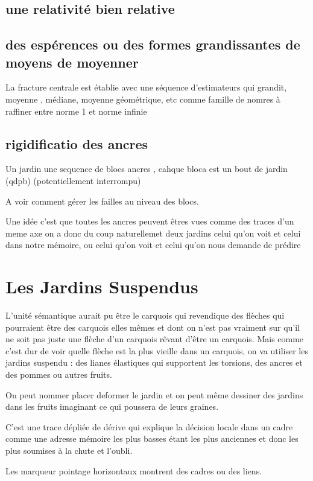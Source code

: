 \documentclass{article}
\begin{document}
\subsection{ une relativité bien relative}

\subsection{des espérences ou des formes grandissantes de moyens de  moyenner}
La fracture centrale  est établie avec une séquence d'estimateurs qui grandit, moyenne , médiane, moyenne géométrique, etc comme famille de nomres à raffiner  entre norme 1 et norme infinie
\subsection{rigidificatio des ancres}
Un jardin une sequence de blocs  ancres  , cahque bloca est un bout de jardin (qdpb) (potentiellement interrompu)

A voir comment gérer les failles au niveau des blocs.

Une idée c'est que toutes les ancres peuvent êtres vues comme des traces d'un meme axe on a donc du coup naturellemet deux jardins
celui qu'on voit et celui dans notre mémoire, ou celui qu'on voit et celui qu'on nous demande de prédire

  \section{Les Jardins Suspendus}
 
 L'unité sémantique  aurait pu être le carquois qui revendique des flèches qui pourraient être des carquois elles mêmes et dont 
on n'est pas vraiment sur qu'il ne soit pas juste  une flèche d'un carquois rêvant d'être un carquois.
Mais comme c'est dur de voir quelle flèche est la plus vieille dans un carquois, on va utiliser  les  jardins suspendu : des lianes élastiques qui supportent les torsions, des ancres et des pommes ou autres fruits. 
 
 On peut nommer placer deformer le jardin et on peut même dessiner des jardins dans les fruits imaginant ce qui poussera de leurs graines.
 
 C'est une trace dépliée de dérive qui explique la décision locale dans un cadre comme une adresse mémoire les plus basses étant les plus anciennes et donc les plus soumises à la chute et l'oubli. 
 
 Les marqueur pointage horizontaux montrent des cadres ou des liens. 
 
\end{document}
